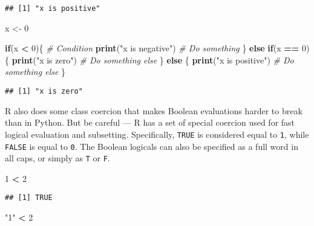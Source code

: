 \documentclass[
]{book}
\newenvironment{Shaded}{\begin{snugshade}}{\end{snugshade}}
\newcommand{\CommentTok}[1]{\textcolor[rgb]{0.56,0.35,0.01}{\textit{#1}}}
\newcommand{\ControlFlowTok}[1]{\textcolor[rgb]{0.13,0.29,0.53}{\textbf{#1}}}
\newcommand{\DecValTok}[1]{\textcolor[rgb]{0.00,0.00,0.81}{#1}}
\newcommand{\KeywordTok}[1]{\textcolor[rgb]{0.13,0.29,0.53}{\textbf{#1}}}
\newcommand{\NormalTok}[1]{#1}
\newcommand{\OperatorTok}[1]{\textcolor[rgb]{0.81,0.36,0.00}{\textbf{#1}}}
\newcommand{\StringTok}[1]{\textcolor[rgb]{0.31,0.60,0.02}{#1}}
\begin{document}
\begin{verbatim}
## [1] "x is positive"
\end{verbatim}

\begin{Shaded}
\begin{Highlighting}[]
\NormalTok{x \textless{}{-}}\StringTok{ }\DecValTok{0}

\ControlFlowTok{if}\NormalTok{(x }\OperatorTok{\textless{}}\StringTok{ }\DecValTok{0}\NormalTok{)\{ }\CommentTok{\# Condition }
  \KeywordTok{print}\NormalTok{(}\StringTok{"x is negative"}\NormalTok{) }\CommentTok{\# Do something }
\NormalTok{\} }\ControlFlowTok{else} \ControlFlowTok{if}\NormalTok{(x }\OperatorTok{==}\StringTok{ }\DecValTok{0}\NormalTok{)\{ }
  \KeywordTok{print}\NormalTok{(}\StringTok{"x is zero"}\NormalTok{) }\CommentTok{\# Do something else }
\NormalTok{\} }\ControlFlowTok{else}\NormalTok{ \{ }\KeywordTok{print}\NormalTok{(}\StringTok{"x is positive"}\NormalTok{) }\CommentTok{\# Do something else }
\NormalTok{\}}
\end{Highlighting}
\end{Shaded}

\begin{verbatim}
## [1] "x is zero"
\end{verbatim}

R also does some class coercion that makes Boolean evaluations harder to break than in Python. But be careful --- R has a set of special coercion used for fast logical evaluation and subsetting. Specifically, \texttt{TRUE} is considered equal to \texttt{1}, while \texttt{FALSE} is equal to \texttt{0}. The Boolean logicals can also be specified as a full word in all caps, or simply as \texttt{T} or \texttt{F}.

\begin{Shaded}
\begin{Highlighting}[]
\DecValTok{1} \OperatorTok{\textless{}}\StringTok{ }\DecValTok{2}
\end{Highlighting}
\end{Shaded}

\begin{verbatim}
## [1] TRUE
\end{verbatim}

\begin{Shaded}
\begin{Highlighting}[]
\StringTok{"1"} \OperatorTok{\textless{}}\StringTok{ }\DecValTok{2}
\end{Highlighting}
\end{Shaded}
\end{document}
